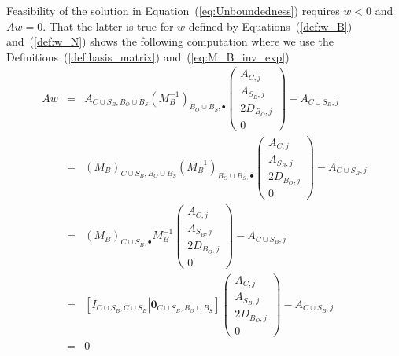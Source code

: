 \documentclass[a4paper]{article}
\begin{document}
Feasibility of the solution in Equation~(\ref{eq:Unboundedness}) requires
$w <0$ and $Aw=0$. That the latter is true for $w$ defined by
Equations~(\ref{def:w_B}) and~(\ref{def:w_N}) shows the following computation
where we use the
Definitions~(\ref{def:basis_matrix}) and~(\ref{eq:M_B_inv_exp})
\begin{eqnarray}
Aw
&=&
A_{C \cup S_{B}, B_{O} \cup B_{S}}
\left(M_{B}^{-1}\right)_{B_{O} \cup B_{S}, \bullet}
\left(
\begin{array}{c}
A_{C,j} \\
\hline
A_{S_{B}, j} \\
\hline
2D_{B_{O}, j} \\
\hline
0
\end{array}
\right)
-A_{C \cup S_{B}, j}
\nonumber \\
&=&
\left(M_{B}\right)_{C \cup S_{B}, B_{O} \cup B_{S}}
\left(M_{B}^{-1}\right)_{B_{O} \cup B_{S}, \bullet}
\left(
\begin{array}{c}
A_{C,j} \\
\hline
A_{S_{B}, j} \\
\hline
2D_{B_{O}, j} \\
\hline
0
\end{array}
\right)
-A_{C \cup S_{B}, j}
\nonumber \\
&=&
\left(M_{B}\right)_{C \cup S_{B}, \bullet}
M_{B}^{-1}
\left(
\begin{array}{c}
A_{C,j} \\
\hline
A_{S_{B}, j} \\
\hline
2D_{B_{O}, j} \\
\hline
0
\end{array}
\right)
-A_{C \cup S_{B}, j}
\nonumber \\
&=&
\left[
  I_{C\cup S_{B},C\cup S_{B}} \left|\right.
  \mathbf{0}_{C\cup S_{B},B_{O}\cup B_{S}}
\right]
\left(
\begin{array}{c}
A_{C,j} \\
\hline
A_{S_{B}, j} \\
\hline
2D_{B_{O}, j} \\
\hline
0
\end{array}
\right)
-A_{C \cup S_{B}, j}
\nonumber \\
&=&
0
\end{eqnarray}
\end{document}
